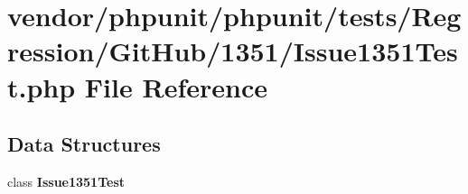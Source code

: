 \section{vendor/phpunit/phpunit/tests/\+Regression/\+Git\+Hub/1351/\+Issue1351\+Test.php File Reference}
\label{_issue1351_test_8php}
\subsection*{Data Structures}
\begin{DoxyCompactItemize}
\item 
class {\bf Issue1351\+Test}
\end{DoxyCompactItemize}
